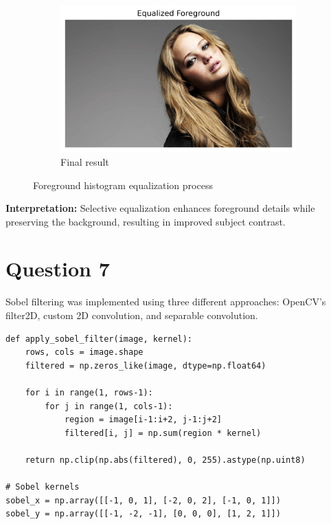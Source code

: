 \documentclass[10pt,a4paper]{article}
\begin{document}
\begin{figure}[H]
\begin{subfigure}{0.24\textwidth}
    \end{subfigure}
    \begin{subfigure}{0.24\textwidth}
        \includegraphics[width=\textwidth]{task6/5_result.png}
        \caption{Final result}
    \end{subfigure}
    \caption{Foreground histogram equalization process}
\end{figure}

\textbf{Interpretation:} Selective equalization enhances foreground details while preserving the background, resulting in improved subject contrast.

\section{Question 7}
Sobel filtering was implemented using three different approaches: OpenCV's filter2D, custom 2D convolution, and separable convolution.

\begin{lstlisting}[caption=Custom Sobel filtering implementation]
def apply_sobel_filter(image, kernel):
    rows, cols = image.shape
    filtered = np.zeros_like(image, dtype=np.float64)
    
    for i in range(1, rows-1):
        for j in range(1, cols-1):
            region = image[i-1:i+2, j-1:j+2]
            filtered[i, j] = np.sum(region * kernel)
    
    return np.clip(np.abs(filtered), 0, 255).astype(np.uint8)

# Sobel kernels
sobel_x = np.array([[-1, 0, 1], [-2, 0, 2], [-1, 0, 1]])
sobel_y = np.array([[-1, -2, -1], [0, 0, 0], [1, 2, 1]])
\end{lstlisting}
\end{document}
